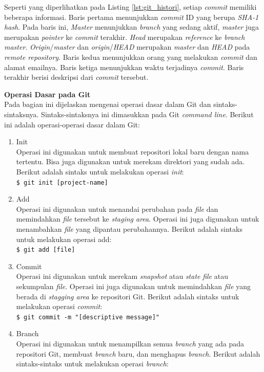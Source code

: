 \documentclass[a4paper,twoside]{article}
\begin{document}
\begin{enumerate}
Seperti yang diperlihatkan pada Listing \ref{lst:git_histori}, setiap \textit{commit} memiliki beberapa informasi. Baris pertama menunjukkan \textit{commit} ID yang berupa \textit{SHA-1 hash}. Pada baris ini, \textit{Master} menunjukkan \textit{branch} yang sedang aktif, \textit{master} juga merupakan \textit{pointer} ke \textit{commit} terakhir. \textit{Head} merupakan \textit{reference} ke \textit{branch master}. \textit{Origin}/\textit{master} dan \textit{origin}/\textit{HEAD} merupakan \textit{master} dan \textit{HEAD} pada \textit{remote repository}. Baris kedua menunjukkan orang yang melakukan \textit{commit} dan alamat emailnya. Baris ketiga menunjukkan waktu terjadinya \textit{commit}. Baris terakhir berisi deskripsi dari \textit{commit} tersebut.

\textbf{Operasi Dasar pada Git}\\
Pada bagian ini dijelaskan mengenai operasi dasar dalam Git dan sintaks-sintaksnya. Sintaks-sintaksnya ini dimasukkan pada Git \textit{command line}. Berikut ini adalah operasi-operasi dasar dalam Git:
\begin{enumerate}
\item Init\\
Operasi ini digunakan untuk membuat repositori lokal baru dengan nama tertentu. Bisa juga digunakan untuk merekam direktori yang sudah ada. Berikut adalah sintaks untuk melakukan operasi  \textit{init}:\\
\texttt{\$ git init [project-name]}  
\item Add\\
Operasi ini digunakan untuk menandai perubahan pada \textit{file} dan memindahkan \textit{file} tersebut ke \textit{staging area}. Operasi ini juga digunakan untuk menambahkan \textit{file} yang dipantau perubahannya. Berikut adalah sintaks untuk melakukan operasi add:\\
\texttt{\$ git add [file]}  
\item Commit\\
Operasi ini digunakan untuk merekam \textit{snapshot} atau \textit{state} \textit{file} atau sekumpulan \textit{file}. Operasi ini juga digunakan untuk memindahkan \textit{file} yang berada di \textit{stagging area} ke repositori Git. Berikut adalah sintaks untuk melakukan operasi \textit{commit}:\\
\texttt{\$ git commit -m "[descriptive message]"}  
\item Branch\\
Operasi ini digunakan untuk menampilkan semua \textit{branch} yang ada pada repositori Git, membuat \textit{branch} baru, dan menghapus \textit{branch}. Berikut adalah sintaks-sintaks untuk melakukan operasi \textit{branch}:\\

\end{enumerate}
\end{enumerate}
\end{document}

